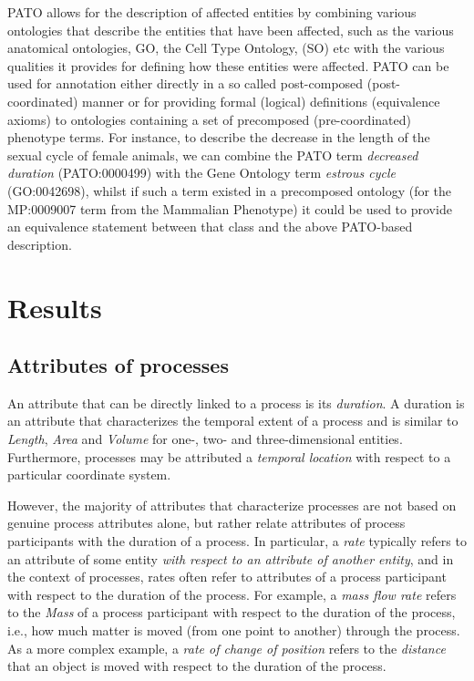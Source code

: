 \documentclass{bioinfo}
\renewcommand{\cite}{\citep}
\begin{document}
PATO allows for the description of affected entities by combining
various ontologies that describe the entities that have been affected,
such as the various anatomical ontologies, GO\cite {Ashburner2000b},
the Cell Type Ontology\cite {Bard2005a}, (SO)\cite {Eilbeck2005} etc
with the various qualities it provides for defining how these entities
were affected.  PATO can be used for annotation either directly in a
so called post-composed (post-coordinated) manner or for providing
formal (logical) definitions (equivalence axioms) to ontologies
containing a set of precomposed (pre-coordinated) phenotype terms. For
instance, to describe the decrease in the length of the sexual cycle
of female animals, we can combine the PATO term \textit{decreased
  duration} (PATO:0000499) with the Gene Ontology term \textit{estrous
  cycle} (GO:0042698), whilst if such a term existed in a precomposed
ontology (for the MP:0009007 term from the Mammalian Phenotype) it
could be used to provide an equivalence statement between that class
and the above PATO-based description.

\section{Results}
\subsection{Attributes of processes}
An attribute that can be directly linked to a process is its {\em
  duration}. A duration is an attribute that characterizes the
temporal extent of a process and is similar to {\em Length}, {\em
  Area} and {\em Volume} for one-, two- and three-dimensional
entities. Furthermore, processes may be attributed a {\em temporal
  location} with respect to a particular coordinate system.

However, the majority of attributes that characterize processes are
not based on genuine process attributes alone, but rather relate
attributes of process participants with the duration of a process. In
particular, a {\em rate} typically refers to an attribute of some
entity {\em with respect to an attribute of another entity}, and in
the context of processes, rates often refer to attributes of a process
participant with respect to the duration of the process. For example,
a {\em mass flow rate} refers to the {\em Mass} of a process
participant with respect to the duration of the process, i.e., how
much matter is moved (from one point to another) through the process.
As a more complex example, a {\em rate of change of position} refers
to the {\em distance} that an object is moved with respect to the
duration of the process.
\end{document}
